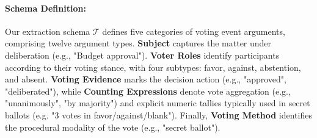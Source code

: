 \documentclass[11pt]{article}
\begin{document}
\paragraph{Schema Definition:} Our extraction schema $\mathcal{T}$ defines five categories of voting event arguments, comprising twelve argument types. \textbf{Subject} captures the matter under deliberation (e.g., "Budget approval"). \textbf{Voter Roles} identify participants according to their voting stance, with four subtypes: favor, against, abstention, and absent. \textbf{Voting Evidence} marks the decision action (e.g., "approved", "deliberated"), while \textbf{Counting Expressions} denote vote aggregation (e.g., "unanimously", "by majority") and explicit numeric tallies typically used in secret ballots (e.g. "3 votes in favor/against/blank"). Finally, \textbf{Voting Method} identifies the procedural modality of the vote (e.g., "secret ballot"). 



\end{document}
